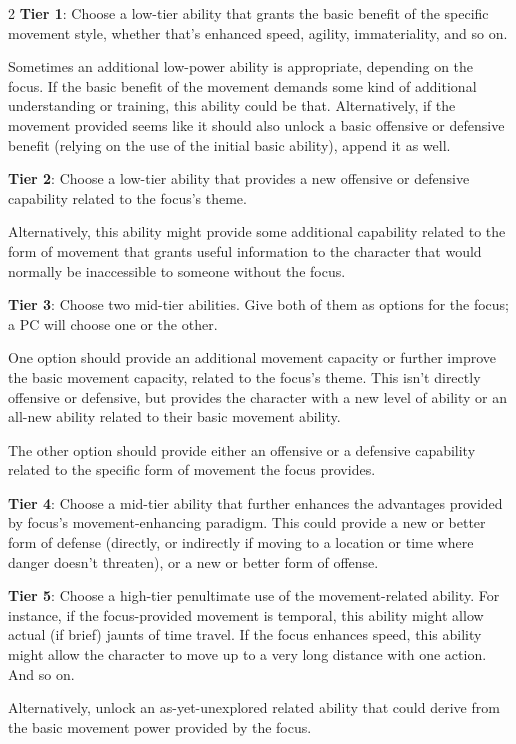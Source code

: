 \begin{multicols}{2}
\textbf{Tier 1}: Choose a low-tier ability that grants the basic benefit of the specific movement style, whether that’s enhanced speed, agility, immateriality, and so on.

Sometimes an additional low-power ability is appropriate, depending on the focus. If the basic benefit of the movement demands some kind of additional understanding or training, this ability could be that. Alternatively, if the movement provided seems like it should also unlock a basic offensive or defensive benefit (relying on the use of the initial basic ability), append it as well.

\textbf{Tier 2}: Choose a low-tier ability that provides a new offensive or defensive capability related to the focus’s theme. 

Alternatively, this ability might provide some additional capability related to the form of movement that grants useful information to the character that would normally be inaccessible to someone without the focus.

\textbf{Tier 3}: Choose two mid-tier abilities. Give both of them as options for the focus; a PC will choose one or the other.

One option should provide an additional movement capacity or further improve the basic movement capacity, related to the focus’s theme. This isn’t directly offensive or defensive, but provides the character with a new level of ability or an all-new ability related to their basic movement ability.

The other option should provide either an offensive or a defensive capability related to the specific form of movement the focus provides. 

\textbf{Tier 4}: Choose a mid-tier ability that further enhances the advantages provided by focus’s movement-enhancing paradigm. This could provide a new or better form of defense (directly, or indirectly if moving to a location or time where danger doesn’t threaten), or a new or better form of offense.

\textbf{Tier 5}: Choose a high-tier penultimate use of the movement-related ability. For instance, if the focus-provided movement is temporal, this ability might allow actual (if brief) jaunts of time travel. If the focus enhances speed, this ability might allow the character to move up to a very long distance with one action. And so on.

Alternatively, unlock an as-yet-unexplored related ability that could derive from the basic movement power provided by the focus.


\end{multicols}
